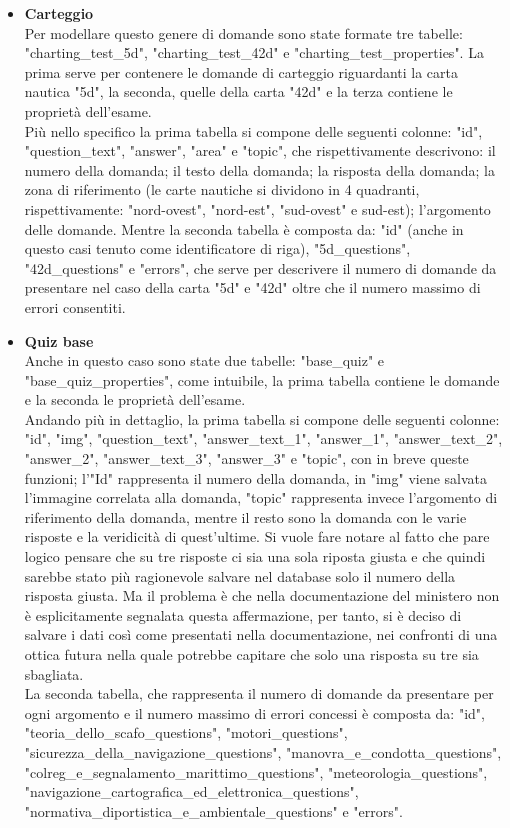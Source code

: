 \begin{itemize}
	\item \textbf{Carteggio}\\
	Per modellare questo genere di domande sono state formate tre tabelle: "charting\_test\_5d", "charting\_test\_42d" e "charting\_test\_properties". La prima serve per contenere  le domande di carteggio riguardanti la carta nautica "5d", la seconda, quelle della carta "42d" e la terza contiene le proprietà dell'esame.\\
	Più nello specifico la prima tabella si compone delle seguenti colonne: "id", "question\_text", "answer", "area" e "topic", che rispettivamente descrivono: il numero della domanda; il testo della domanda; la risposta della domanda; la zona di riferimento (le carte nautiche si dividono in 4 quadranti, rispettivamente: "nord-ovest", "nord-est", "sud-ovest" e sud-est); l'argomento delle domande.  Mentre la seconda tabella è composta da: "id" (anche in questo casi tenuto come identificatore di riga), "5d\_questions", "42d\_questions" e "errors", che serve per descrivere il numero di domande da presentare nel caso della carta "5d" e  "42d" oltre che il numero massimo di errori consentiti. \\
	
	\item \textbf{Quiz base}\\
	Anche in questo caso sono state due tabelle: "base\_quiz" e "base\_quiz\_properties", come intuibile, la prima tabella contiene le domande e la seconda le proprietà dell'esame.\\
	Andando più in dettaglio, la prima tabella si compone delle seguenti colonne: "id", "img",  "question\_text", "answer\_text\_1", "answer\_1", "answer\_text\_2", "answer\_2", "answer\_text\_3", "answer\_3" e "topic", con in breve queste funzioni; l'"Id" rappresenta il numero della domanda, in "img" viene salvata l'immagine correlata alla domanda, "topic" rappresenta invece l'argomento di riferimento della domanda, mentre il resto sono la domanda con le varie risposte e la veridicità di quest'ultime. Si vuole fare notare al fatto che pare logico pensare che su tre risposte ci sia una sola riposta giusta e che quindi sarebbe stato più ragionevole salvare nel database solo il numero della risposta giusta. Ma il problema è che nella documentazione del ministero non è esplicitamente segnalata questa affermazione, per tanto, si è deciso di salvare i dati così come presentati nella documentazione,  nei confronti di una ottica futura nella quale potrebbe capitare che solo una risposta su tre sia sbagliata.\\
	La seconda tabella, che rappresenta il numero di domande da presentare per ogni argomento e il numero massimo di errori concessi è composta da: "id", "teoria\_dello\_scafo\_questions", "motori\_questions", "sicurezza\_della\_navigazione\_questions", "manovra\_e\_condotta\_questions", "colreg\_e\_segnalamento\_marittimo\_questions", "meteorologia\_questions", "navigazione\_cartografica\_ed\_elettronica\_questions", "normativa\_diportistica\_e\_ambientale\_questions" e  "errors".\\
	

\end{itemize}
